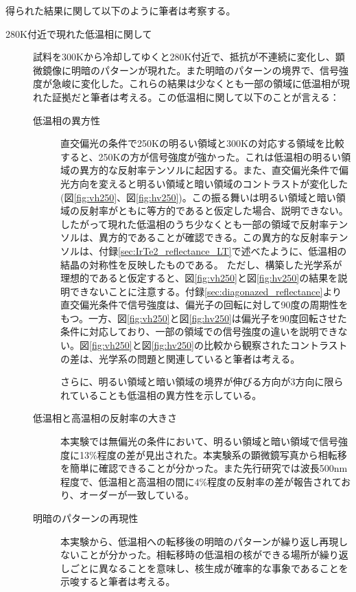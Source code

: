 得られた結果に関して以下のように筆者は考察する。
\begin{description}
\item[280K付近で現れた低温相に関して]
\item[]
試料を300Kから冷却してゆくと280K付近で、抵抗が不連続に変化し、顕微鏡像に明暗のパターンが現れた。また明暗のパターンの境界で、信号強度が急峻に変化した。これらの結果は少なくとも一部の領域に低温相が現れた証拠だと筆者は考える。この低温相に関して以下のことが言える：

\begin{description}
\item[低温相の異方性]
直交偏光の条件で250Kの明るい領域と300Kの対応する領域を比較すると、250Kの方が信号強度が強かった。これは低温相の明るい領域の異方的な反射率テンソルに起因する。また、直交偏光条件で偏光方向を変えると明るい領域と暗い領域のコントラストが変化した(図\ref{fig:vh250}、図\ref{fig:hv250})。この振る舞いは明るい領域と暗い領域の反射率がともに等方的であると仮定した場合、説明できない。したがって現れた低温相のうち少なくとも一部の領域で反射率テンソルは、異方的であることが確認できる。この異方的な反射率テンソルは、付録\ref{sec:IrTe2_reflectance_LT}で述べたように、低温相の結晶の対称性を反映したものである。
ただし、構築した光学系が理想的であると仮定すると、図\ref{fig:vh250}と図\ref{fig:hv250}の結果を説明できないことに注意する。付録\ref{sec:diagonazed_reflectance}より直交偏光条件で信号強度は、偏光子の回転に対して90度の周期性をもつ。一方、図\ref{fig:vh250}と図\ref{fig:hv250}は偏光子を90度回転させた条件に対応しており、一部の領域での信号強度の違いを説明できない。図\ref{fig:vh250}と図\ref{fig:hv250}の比較から観察されたコントラストの差は、光学系の問題と関連していると筆者は考える。

さらに、明るい領域と暗い領域の境界が伸びる方向が3方向に限られていることも低温相の異方性を示している。

\item[低温相と高温相の反射率の大きさ]
本実験では無偏光の条件において、明るい領域と暗い領域で信号強度に13\%程度の差が見出された。本実験系の顕微鏡写真から相転移を簡単に確認できることが分かった。また先行研究\cite{reflectance_IrTe2}では波長500nm程度で、低温相と高温相の間に4\%程度の反射率の差が報告されており、オーダーが一致している。

\item[明暗のパターンの再現性]
本実験から、低温相への転移後の明暗のパターンが繰り返し再現しないことが分かった。相転移時の低温相の核ができる場所が繰り返しごとに異なることを意味し、核生成が確率的な事象であることを示唆すると筆者は考える。


\end{description}
\end{description}
